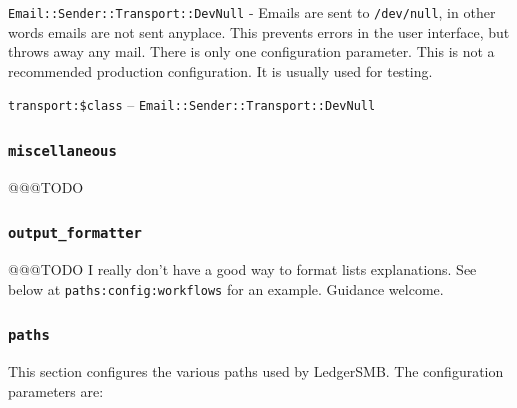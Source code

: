 \begin{description}
    \item{\texttt{Email::Sender::Transport::DevNull}} -  Emails are sent to \texttt{/dev/null}, in other words emails are not sent anyplace. This prevents errors in the user interface, but throws away any mail.  There is only one configuration parameter.  This is not a recommended production configuration. It is usually used for testing.
    \begin{description}
        \item{\texttt{transport:\$class}} – \texttt{Email::Sender::Transport::DevNull}
    \end{description}

\end{description}

\subsubsection{\texttt{miscellaneous}}
@@@TODO

\subsubsection{\texttt{output\_formatter}}
@@@TODO  I really don't have a good way to format lists explanations.  See below at \texttt{paths:config:workflows} for an example. Guidance welcome.

\subsubsection{\texttt{paths}}

This section configures the various paths used by LedgerSMB. The configuration parameters are:

